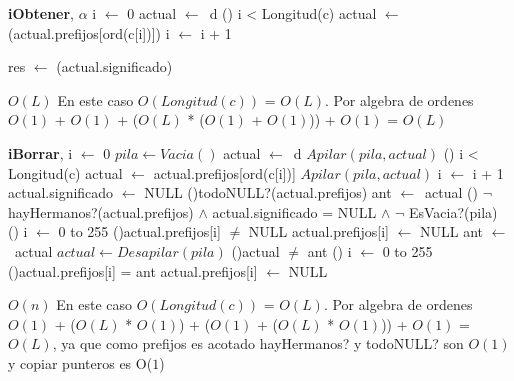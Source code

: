\begin{Algoritmos}
\begin{algoritmo}{\textbf{iObtener}}{, }{$\alpha$}
			 i $\leftarrow$ 0 
			 actual $\leftarrow$\ d 
			 \While() {i < Longitud(c)}{ 
				actual $\leftarrow$ (actual.prefijos[ord(c[i])]) 
				i $\leftarrow$ i + 1 
			 }
             
			 res $\leftarrow$ (actual.significado) 
			    	
\end{algoritmo}
\datosAlgoritmo{} %
  {} %
  {} %
  {$O(L)$} %
  {En este caso $O(Longitud(c))$ = $O(L)$. Por algebra de ordenes $O(1)$ + $O(1)$ + ($O(L)$ * ($O(1)$ + $O(1)$)) + $O(1)$ = $O(L)$} %
  
\begin{algoritmo}{\textbf{iBorrar}}{,  }{}
			 i $\gets$ 0 
             $pila \gets Vacia()$ 
			 actual $\gets$\ d 
             $Apilar(pila, actual)$ 
			 \While() {i < Longitud(c)}{
             	actual $\gets$ actual.prefijos[ord(c[i])] 	
                $Apilar(pila, actual)$ 
             	i $\gets$ i + 1 
			 }
			 actual.significado $\gets$ NULL 
             \If(){todoNULL?(actual.prefijos)}{
             		ant $\gets$\ actual 
					\While() {$\neg$ hayHermanos?(actual.prefijos) $\land$ actual.significado = NULL $\land$ $\neg$ EsVacia?(pila)}{
                		\For () {i $\leftarrow$ 0 to 255}{
							\If(){actual.prefijos[i] $\neq$ NULL }{
                        		actual.prefijos[i] $\gets$ NULL 
			 				}
                    	}    
                        ant $\gets$\ actual 
						$actual \gets Desapilar(pila)$ 
                    }
                    \If(){actual $\neq$ ant }{
                    	\For () {i $\leftarrow$ 0 to 255}{
                        	\If(){actual.prefijos[i] = ant}{
                            	actual.prefijos[i] $\gets$ NULL 
                          	}
                      	}
					}
                } 	
\end{algoritmo}
\datosAlgoritmo{} %
  {} %
  {} %
  {$O(n)$} %
  {En este caso $O(Longitud(c))$ = $O(L)$. Por algebra de ordenes $O(1)$ + ($O(L)$ * $O(1)$) + ($O(1)$ + ($O(L)$ * $O(1)$)) + $O(1)$ = $O(L)$, ya que como prefijos es acotado hayHermanos? y todoNULL? son $O(1)$ y copiar punteros es O($1$)} %


\end{Algoritmos}
